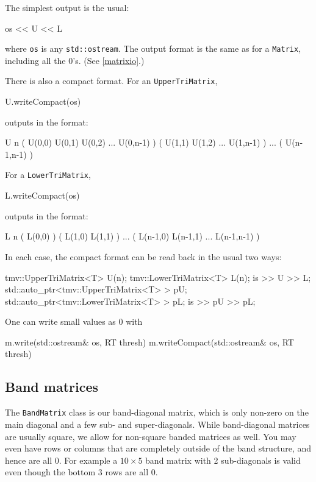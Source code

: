 \documentclass[twoside,letterpaper,11pt]{article}
\renewcommand{\tt}[1]{{\lstinline {#1}}}
\begin{document}
The simplest output is the usual:
\begin{tmvcode}
os << U << L
\end{tmvcode}
where \tt{os} is any \tt{std::ostream}.
The output format is the same as for a \tt{Matrix}, including all the 0's.
(See \ref{matrixio}.)

There is also a compact format.  For an \tt{UpperTriMatrix},
\begin{tmvcode}
U.writeCompact(os)
\end{tmvcode}
outputs in the format:
\begin{tmvcode}
U n 
( U(0,0)  U(0,1)  U(0,2)  ...  U(0,n-1) )
( U(1,1)  U(1,2)  ...  U(1,n-1) )
...
( U(n-1,n-1) )
\end{tmvcode}
For a \tt{LowerTriMatrix},
\begin{tmvcode}
L.writeCompact(os)
\end{tmvcode}
outputs in the format:
\begin{tmvcode}
L n 
( L(0,0) )
( L(1,0)  L(1,1) )
...
( L(n-1,0)  L(n-1,1) ... L(n-1,n-1) )
\end{tmvcode}

In each case, the compact format can be read back in the usual two ways:
\begin{tmvcode}
tmv::UpperTriMatrix<T> U(n);
tmv::LowerTriMatrix<T> L(n);
is >> U >> L;
std::auto_ptr<tmv::UpperTriMatrix<T> > pU;
std::auto_ptr<tmv::LowerTriMatrix<T> > pL;
is >> pU >> pL;
\end{tmvcode}

One can write small values as 0 with
\begin{tmvcode}
m.write(std::ostream& os, RT thresh)
m.writeCompact(std::ostream& os, RT thresh)
\end{tmvcode}

\subsection{Band matrices}

The \tt{BandMatrix} class is our band-diagonal matrix, which is only non-zero
on the main diagonal and a few sub- and super-diagonals.  While band-diagonal
matrices are usually square, we allow for non-square banded matrices as well.
You may even have rows or columns that are completely outside of the 
band structure, and hence are all 0.  For example a $10\times 5$ band matrix
with 2 sub-diagonals is valid even though the bottom 3 rows are all 0.
\end{document}
